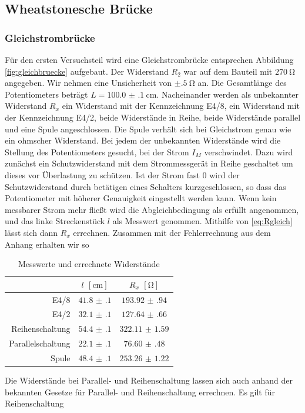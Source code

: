 \subsection{Wheatstonesche Brücke}

\subsubsection{Gleichstrombrücke}
Für den ersten Versuchsteil wird eine Gleichstrombrücke entsprechen Abbildung \ref{fig:gleichbruecke} aufgebaut. Der Widerstand $ R_2 $ war auf dem Bauteil mit $ \SI{270}{\ohm} $ angegeben. Wir nehmen eine Unsicherheit von $ \pm\SI{.5}{\ohm} $ an. Die Gesamtlänge des Potentiometers beträgt $ L = \SI{100.0(1)}{\centi\meter} $. Nacheinander werden als unbekannter Widerstand $ R_x $ ein Widerstand mit der Kennzeichnung E4/8, ein Widerstand mit der Kennzeichnung E4/2, beide Widerstände in Reihe, beide Widerstände parallel und eine Spule angeschlossen. Die Spule verhält sich bei Gleichstrom genau wie ein ohmscher Widerstand. Bei jedem der unbekannten Widerstände wird die Stellung des Potentiometers gesucht, bei der Strom $ I_M $ verschwindet. Dazu wird zunächst ein Schutzwiderstand mit dem Strommessgerät in Reihe geschaltet um dieses vor Überlastung zu schützen. Ist der Strom fast $ 0 $ wird der Schutzwiderstand durch betätigen eines Schalters kurzgeschlossen, so dass das Potentiometer mit höherer Genauigkeit eingestellt werden kann. Wenn kein messbarer Strom mehr fließt wird die Abgleichbedingung als erfüllt angenommen, und das linke Streckenstück $ l $ als Messwert genommen. Mithilfe von \eqref{eq:Rgleich} lässt sich dann $ R_x $ errechnen. Zusammen mit der Fehlerrechnung aus dem Anhang erhalten wir so
\begin{table}[H]
	\centering
	\begin{tabular}{r|cc}
		 & $ l $ $ [\si{\centi\meter}] $ & $ R_x $ $ [\si{\ohm}] $ \\\hline
		E4/8 & $ \num{41.8(1)} $ & $ \num{193.92(94)} $\\
		E4/2 & $ \num{32.1(1)} $ & $ \num{127.64(66)} $\\
		Reihenschaltung & $ \num{54.4(1)} $ & $ \num{322.11(159)} $\\
		Parallelschaltung & $ \num{22.1(1)} $ & $ \num{76.60(48)} $\\
		Spule & $ \num{48.4(1)} $ & $ \num{253.26(122)} $
	\end{tabular}
	\caption{Messwerte und errechnete Widerstände}
\end{table}
Die Widerstände bei Parallel- und Reihenschaltung lassen sich auch anhand der bekannten Gesetze für Parallel- und Reihenschaltung errechnen. Es gilt für Reihenschaltung
